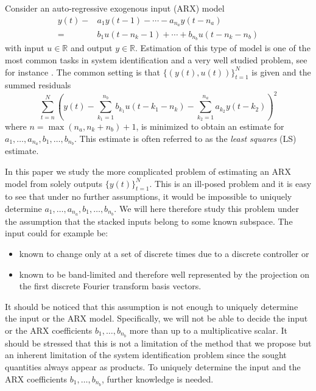 \documentclass{ifacconf}
\renewcommand{\b}{{ b}}
\newcommand{\0}{{\bf 0}}
\renewcommand{\a}{a}
\renewcommand{\Re}{{\mathbb{R}}}
\begin{document}
Consider an auto-regressive exogenous input (ARX) model   
\begin{align}\nonumber
y(t)-&\a_1 y(t-1)  - \cdots - \a_{n_a} y(t-n_a) \\=&
\b_1 u(t-n_k - 1) +\cdots +\b_{n_b} u(t-n_k - n_b) 
\end{align} with input $u \in \Re$ and output $y \in \Re$.
Estimation of this type of model is one of  the most common tasks in
system identification and a very well studied problem, see for instance \citet{Ljung:99}. 
The common
setting is that $\{(y(t),u(t))\}_{t=1}^N$  is given and the summed
residuals{\small
\begin{equation*}
\sum_{t=n}^N \left (y(t) - \sum_{k_1=1}^{n_b}
\b_{k_1} u(t-k_1-n_k) - \sum_{k_2=1}^{n_a}
\a_{k_2} y(t-k_2) \right )^2
\end{equation*}}where $n=\max( n_a, n_k+n_b)+1$, is minimized to obtain an estimate for $\a_1,\dots, \a_{n_a},\b_1,\dots, \b_{n_b}$. This estimate is often
referred to as the \textit{least squares} (LS) estimate.


In this paper we study the more complicated problem of
estimating an ARX model from solely outputs $\{y(t)\}_{t=1}^N$. This is
an ill-posed problem and it is easy to see that under no further
assumptions, it would be impossible to uniquely determine
$\a_1,\dots, \a_{n_a},\b_1,\dots, \b_{n_b}$. We will here therefore study this problem under the assumption
that the stacked inputs belong to some known subspace. The input
could for example be:
\begin{itemize}
\item known to change only at a set of discrete times
due to a discrete controller or  
\item known to be band-limited and therefore well represented by the projection
  on the first discrete Fourier transform basis vectors.  
\end{itemize}
It should be noticed that this assumption 
is not enough to uniquely determine the input or the ARX
model. Specifically, we will not be able to decide the input or the
ARX coefficients $\b_1,\dots, \b_{n_b}$  more than up to a
multiplicative scalar. It should be stressed that this is not a
limitation of the method that we propose but an inherent
limitation of the system identification problem since the sought quantities
always appear as products. To uniquely determine the input and the
ARX coefficients $\b_1,\dots, \b_{n_b}$, further knowledge is needed.  
\end{document}
